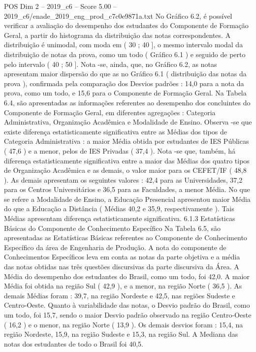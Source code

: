 \begin{textsample}{POS Dim 2 – 2019\_c6 – Score 5.00 – 2019\_c6/enade\_2019\_eng\_prod\_c7c0e9871a.txt}
No Gráfico 6.2, é possível verificar a avaliação do desempenho dos estudantes do Componente de Formação Geral, a partir do histograma da distribuição das notas correspondentes.
A distribuição é unimodal, com moda em ( 30 ; 40 ], o mesmo intervalo modal da distribuição de notas da prova, como um todo ( Gráfico 6.1 ) e seguido de perto pelo intervalo ( 40 ; 50 ].
Nota -se, ainda, que, no Gráfico 6.2, as notas apresentam maior dispersão do que as no Gráfico 6.1 ( distribuição das notas da prova ), confirmada pela comparação dos Desvios padrões : 14,0 para a nota da prova, como um todo, e 15,6 para o Componente de Formação Geral.
Na Tabela 6.4, são apresentadas as informações referentes ao desempenho dos concluintes do Componente de Formação Geral, em diferentes agregações : Categoria Administrativa, Organização Acadêmica e Modalidade de Ensino.
Observa -se que existe diferença estatisticamente significativa entre as Médias dos tipos de Categoria Administrativa : a maior Média obtida por estudantes de IES Públicas ( 47,6 ) e a menor, pelos de IES Privadas ( 37,4 ).
Nota -se que, também, há diferença estatisticamente significativa entre a maior das Médias dos quatro tipos de Organização Acadêmica e as demais, o valor maior para os CEFET/IF ( 48,8 ).
As demais apresentam os seguintes valores : 42,4 para as Universidades, 37,2 para os Centros Universitários e 36,5 para as Faculdades, a menor Média.
No que se refere a Modalidade de Ensino, a Educação Presencial apresentou maior Média do que a Educação a Distância ( Médias 40,2 e 35,9, respectivamente ).
Tais Médias apresentam diferença estatisticamente significativa. 6.1.3 Estatísticas Básicas do Componente de Conhecimento Específico Na Tabela 6.5, são apresentadas as Estatísticas Básicas referentes ao Componente de Conhecimento Específico da área de Engenharia de Produção.
A nota do componente de Conhecimentos Específicos leva em conta as notas da parte objetiva e a média das notas obtidas nas três questões discursivas da parte discursiva da Área.
A Média do desempenho dos estudantes do Brasil, como um todo, foi 42,0.
A maior Média foi obtida na região Sul ( 42,9 ), e a menor, na região Norte ( 36,5 ).
As demais Médias foram : 39,7, na região Nordeste e 42,5, nas regiões Sudeste e Centro-Oeste.
Quanto à variabilidade das notas, o Desvio padrão do Brasil, como um todo, foi 15,7, sendo o maior Desvio padrão observado na região Centro-Oeste ( 16,2 ) e o menor, na região Norte ( 13,9 ).
Os demais desvios foram : 15,4, na região Nordeste, 15,9, na região Sudeste e 15,3, na região Sul.
A Mediana das notas dos estudantes de todo o Brasil foi 40,5.

\end{textsample}
